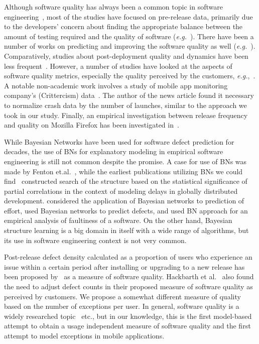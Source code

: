 \documentclass[smallcondensed]{svjour3}     %
\begin{document}
Although software quality has always been a common
topic in software engineering~\cite{boehm1976quantitative,kitchenham1996software}, most of
the studies have focused on pre-release data, primarily due to the
developers' concern about finding the appropriate balance between
the amount of testing required and the quality of software
(\emph{e.g.}~\cite{rubin2016challenges,dalal1988should}). There have been a
number of works on predicting and improving the software quality as
well (\emph{e.g.}~\cite{MHP13,zhang2015towards,KSAHMSU13,MW00}). Comparatively,
studies about post-deployment quality and dynamics have been less
frequent~\cite{li2011characterizing,kenny1993estimating}. However, a
number of studies have looked at the aspects of software quality
metrics, especially the quality perceived by the customers,
\emph{e.g.},~\cite{mockus2005predictors,IQ08,hmps15,rotella2011implementing,M14}. A notable
non-academic work involves a study of mobile app monitoring
company's (Crittercism) data~\cite{crittercism12}. The author of the
news article found it necessary to normalize crash data by the
number of launches, similar to the approach we took in our study. 
Finally, an empirical investigation between
release frequency and quality on Mozilla Firefox has been
investigated in~\cite{khomh2012faster}. 

While Bayesian Networks have been used for software defect prediction 
for decades, the use of BNs for explanatory modeling in
empirical software engineering is still not common despite the
promise. A case for use of BNs was made
by Fenton et.al.~\cite{fenton1999critique,fenton2002software}, while the earliest publications
utilizing BNs we could find~\cite{HM03a} constructed search of the
structure based on the statistical significance of partial
correlations in the context of modeling delays in globally
distributed development. \cite{stamelos2003use,pendharkar2005probabilistic} considered
the application of Bayesian networks to prediction of effort, 
\cite{fenton2007predicting,neil1996predicting,okutan2014software} 
used Bayesian networks to predict defects, and \cite{pai2007empirical} 
used BN approach for an empirical analysis of faultiness of a software. 
On the other hand, Bayesian structure learning is a big domain in itself 
with a wide range of algorithms, but its use in software engineering context 
is not very common.

Post-release defect density calculated as a proportion of users who experience an issue within a certain period after installing or upgrading to a new release has been proposed by~\cite{mockus2008interval,mockus2005predictors} as a measure of software quality.  Hackbarth et al.~\cite{hackbarth2016improving} also found the need to adjust defect counts in their proposed measure of software quality as perceived by customers. We propose a somewhat different measure of quality based on the number of exceptions per user. In general, software quality is a widely researched topic~\cite{kan2002metrics,kitchenham1996software,schulmeyer1992handbook} etc., but in our knowledge, this is the first model-based attempt to obtain a usage independent measure of software quality and the first attempt to model exceptions in mobile applications.
\end{document}
